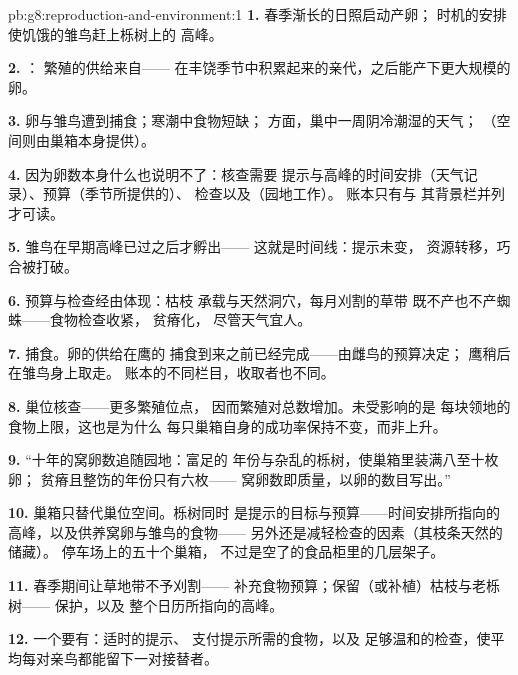 \begin{solution}{pb:g8:reproduction-and-environment:1}
\textbf{1.} 春季渐长的日照启动产卵；
时机的安排使饥饿的雏鸟赶上栎树上的
高峰。

\textbf{2.} ：
繁殖的供给来自——
在丰饶季节中积累起来的亲代，之后能产下更大规模的卵。

\textbf{3.} 卵与雏鸟遭到捕食；寒潮中食物短缺；
方面，巢中一周阴冷潮湿的天气；
（空间则由巢箱本身提供）。

\textbf{4.} 因为卵数本身什么也说明不了：核查需要
提示与高峰的时间安排（天气记录）、预算（季节所提供的）、
检查以及（园地工作）。
账本只有与
其背景栏并列才可读。

\textbf{5.} 雏鸟在早期高峰已过之后才孵出——
这就是时间线：提示未变，
资源转移，巧合被打破。

\textbf{6.} 预算与检查经由体现：枯枝
承载与天然洞穴，每月刈割的草带
既不产也不产蜘蛛——食物检查收紧，
贫瘠化，
尽管天气宜人。

\textbf{7.} 捕食。卵的供给在鹰的
捕食到来之前已经完成——由雌鸟的预算决定；
鹰稍后在雏鸟身上取走。
账本的不同栏目，收取者也不同。

\textbf{8.} 巢位核查——更多繁殖位点，
因而繁殖对总数增加。未受影响的是
每块领地的食物上限，这也是为什么
每只巢箱自身的成功率保持不变，而非上升。

\textbf{9.} “十年的窝卵数追随园地：富足的
年份与杂乱的栎树，使巢箱里装满八至十枚卵；
贫瘠且整饬的年份只有六枚——
窝卵数即质量，以卵的数目写出。”

\textbf{10.} 巢箱只替代巢位空间。栎树同时
是提示的目标与预算——时间安排所指向的
高峰，以及供养窝卵与雏鸟的食物——
另外还是减轻检查的因素（其枝条天然的储藏）。
停车场上的五十个巢箱，
不过是空了的食品柜里的几层架子。

\textbf{11.} 春季期间让草地带不予刈割——
补充食物预算；保留（或补植）枯枝与老栎树——
保护，以及
整个日历所指向的高峰。

\textbf{12.} 一个要有：适时的提示、
支付提示所需的食物，以及
足够温和的检查，使平均每对亲鸟都能留下一对接替者。
\end{solution}
